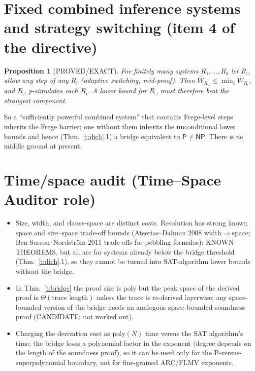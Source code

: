 \documentclass[11pt]{article}
\newtheorem{proposition}{Proposition}
\theoremstyle{remark}
\newcommand{\Wbar}{\overline W}
\begin{document}
\section{Fixed combined inference systems and strategy switching (item 4 of the directive)}
\begin{proposition}[PROVED/EXACT]\label{p:union}
For finitely many systems $R_1,\dots,R_k$ let $R_\cup$ allow any step of any $R_i$ (adaptive switching,
mid-proof). Then $\Wbar_{R_\cup}\le\min_i\Wbar_{R_i}$, and $R_\cup$ p-simulates each $R_i$.
A lower bound for $R_\cup$ must therefore beat the strongest component.
\end{proposition}
So a ``sufficiently powerful combined system'' that contains Frege-level steps inherits the Frege barrier;
one without them inherits the unconditional lower bounds and hence (Thm.~\ref{t:dich}.1) a bridge equivalent
to $\mathsf P\ne\mathsf{NP}$. There is no middle ground at present.

\section{Time/space audit (Time--Space Auditor role)}
\begin{itemize}
\item Size, width, and clause-space are distinct costs. Resolution has strong known space and
size--space trade-off bounds (Atserias--Dalmau 2008 width$\Rightarrow$space; Ben-Sasson--Nordstr\"om 2011
trade-offs for pebbling formulas): KNOWN THEOREMS, but all are for systems already below the bridge threshold
(Thm.~\ref{t:dich}.1), so they cannot be turned into SAT-algorithm lower bounds without the bridge.
\item In Thm.~\ref{t:bridge} the proof size is $\mathrm{poly}$ but the peak space of the derived
proof is $\Theta(\text{trace length})$ unless the trace is re-derived layerwise; any space-bounded
version of the bridge needs an analogous space-bounded soundness proof (CANDIDATE; not worked out).
\item Charging the derivation cost as $\mathrm{poly}(N)$ time versus the SAT algorithm's time: the bridge loses
a polynomial factor in the exponent (degree depends on the length of the soundness proof), so it
can be used only for the P-versus-superpolynomial boundary, not for fine-grained ARC/FLMV exponents.
\end{itemize}
\end{document}
